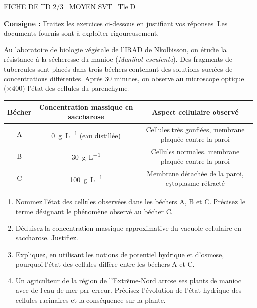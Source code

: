 \documentclass[11pt]{article}
\begin{document}
\begin{tcolorbox}[enhanced,colback=popink,colframe=popink,arc=10pt,boxrule=0pt,left=12pt,right=12pt,top=9pt,bottom=9pt]
{\color{white}\popxbold\small FICHE DE TD 2/3 \textbullet\ MOYEN \hfill SVT \textbullet\ Tle D\par}
\end{tcolorbox}
\vspace{4pt}
\noindent\textbf{Consigne :} Traitez les exercices ci-dessous en justifiant vos réponses. Les documents fournis sont à exploiter rigoureusement.

\begin{exercice}
Au laboratoire de biologie végétale de l'IRAD de Nkolbisson, on étudie la résistance à la sécheresse du manioc (\textit{Manihot esculenta}). Des fragments de tubercules sont placés dans trois béchers contenant des solutions sucrées de concentrations différentes. Après 30 minutes, on observe au microscope optique (×400) l'état des cellules du parenchyme.
\begin{center}
\begin{tabular}{|c|c|c|}
\hline
\textbf{Bécher} & \textbf{Concentration massique en saccharose} & \textbf{Aspect cellulaire observé} \\
\hline
A & \SI{0}{\gram\per\liter} (eau distillée) & Cellules très gonflées, membrane plaquée contre la paroi \\
\hline
B & \SI{30}{\gram\per\liter} & Cellules normales, membrane plaquée contre la paroi \\
\hline
C & \SI{100}{\gram\per\liter} & Membrane détachée de la paroi, cytoplasme rétracté \\
\hline
\end{tabular}
\end{center}
\begin{enumerate}
    \item Nommez l'état des cellules observées dans les béchers A, B et C. Précisez le terme désignant le phénomène observé au bécher C.
    \item Déduisez la concentration massique approximative du vacuole cellulaire en saccharose. Justifiez.
    \item Expliquez, en utilisant les notions de potentiel hydrique et d'osmose, pourquoi l'état des cellules diffère entre les béchers A et C.
    \item Un agriculteur de la région de l'Extrême-Nord arrose ses plants de manioc avec de l'eau de mer par erreur. Prédisez l'évolution de l'état hydrique des cellules racinaires et la conséquence sur la plante.
\end{enumerate}
\end{exercice}
\end{document}

